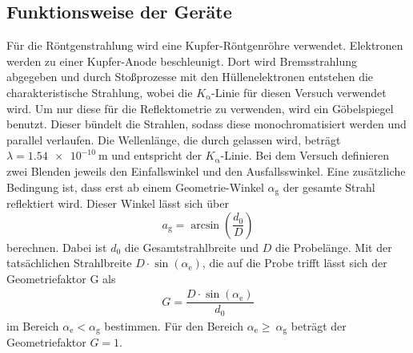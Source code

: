 \subsection{Funktionsweise der Geräte}
\label{sec:Geräte}
Für die Röntgenstrahlung wird eine Kupfer-Röntgenröhre verwendet. Elektronen werden zu einer Kupfer-Anode beschleunigt. Dort wird Bremsstrahlung abgegeben und durch Stoßprozesse mit den Hüllenelektronen entstehen die charakteristische Strahlung, wobei die $K_\mathrm{\alpha}$-Linie für diesen Versuch verwendet wird. Um nur diese für die Reflektometrie zu verwenden, wird ein Göbelspiegel benutzt. Dieser bündelt die Strahlen, sodass diese monochromatisiert werden und parallel verlaufen. Die Wellenlänge, die durch gelassen wird, beträgt $\lambda=\SI{1.54 e-10}{\meter}$ und entspricht der $K_\mathrm{\alpha}$-Linie.
Bei dem Versuch definieren zwei Blenden jeweils den Einfallswinkel und den Ausfallsswinkel. Eine zusätzliche Bedingung ist, dass erst ab einem Geometrie-Winkel $\alpha_\mathrm{g}$ der gesamte Strahl reflektiert wird. Dieser Winkel lässt sich über
\begin{equation}
  \label{eqn:Geometriewinkel}
a_\mathrm{g}=\arcsin\left(\dfrac{d_\mathrm{0}}{D}\right)
\end{equation}
berechnen. Dabei ist $d_\mathrm{0}$ die Gesamtstrahlbreite und $D$ die Probelänge. Mit der tatsächlichen Strahlbreite $D\cdot\sin(\alpha_\mathrm{e})$, die auf die Probe trifft lässt sich der Geometriefaktor G als
\begin{align}
  \label{eqn:Geometriefaktorl}
G= \dfrac{D\cdot\sin(\alpha_\mathrm{e})}{d_\mathrm{0}}
\end{align}
im Bereich $ \alpha_\mathrm{e}< \alpha_\mathrm{g}$ bestimmen. Für den Bereich $\alpha_\mathrm{e}\geq\ \alpha_\mathrm{g}$ beträgt der Geometriefaktor $G=1$.
